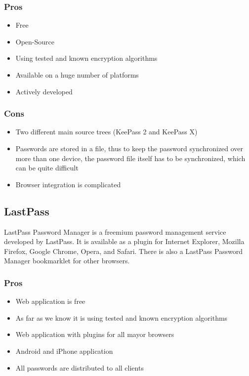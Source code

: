 \documentclass{report}
\begin{document}
\subsubsection{Pros}
\begin{itemize}
	\item Free
	\item Open-Source
	\item Using tested and known encryption algorithms
	\item Available on a huge number of platforms
	\item Actively developed
\end{itemize}

\subsubsection{Cons}
\begin{itemize}
	\item Two different main source trees (KeePass 2 and KeePass X)
	\item Passwords are stored in a file, thus to keep the password synchronized over more than one device, the password file itself has to be synchronized, which can be quite difficult
	\item Browser integration is complicated
\end{itemize}

\subsection{LastPass}
LastPass Password Manager is a freemium password management service developed by LastPass. It is available as a plugin for Internet Explorer, Mozilla Firefox, Google Chrome, Opera, and Safari. There is also a LastPass Password Manager bookmarklet for other browsers.\cite{LastPass} \cite{LastPassWiki}

\subsubsection{Pros}
\begin{itemize}
	\item Web application is free
	\item As far as we know it is using tested and known encryption algorithms
	\item Web application with plugins for all mayor browsers
	\item Android and iPhone application
	\item All passwords are distributed to all clients
\end{itemize}
\end{document}
